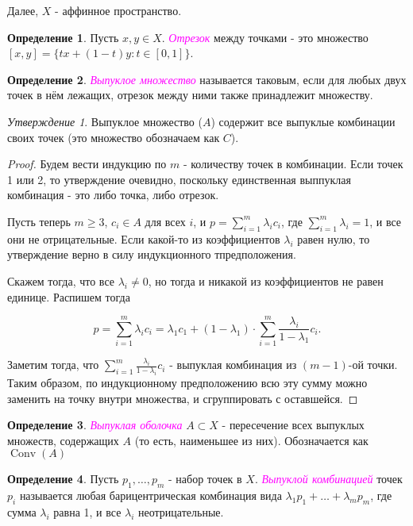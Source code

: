 \documentclass[a4paper,100pt]{article}
\theoremstyle{indented}
\theoremstyle{definition}
\newtheorem{defn}{Определение}
\theoremstyle{remark}
\newtheorem{stat}{Утверждение}
\DeclareMathOperator{\Conv}{Conv}
\begin{document}
Далее, $X$ - аффинное пространство.

\begin{defn}
    Пусть $x, y \in X$. \textit{\textcolor{magenta}{\hypertarget{s88}{Отрезок}}} между точками - это множество $[x, y] = \{tx+(1-t)y : t\in [0, 1]\}$. 
\end{defn}

\begin{defn}
    \textit{\textcolor{magenta}{\hypertarget{s89}{Выпуклое множество}}} называется таковым, если для любых двух точек в нём лежащих, отрезок между ними также принадлежит множеству.
\end{defn}

\begin{stat}
    Выпуклое множество ($A$) содержит все выпуклые комбинации своих точек (это множество обозначаем как $C$).
\end{stat}

\begin{proof}
    Будем вести индукцию по $m$ - количеству точек в комбинации. Если точек 1 или 2, то утверждение очевидно, поскольку единственная выппуклая комбинация - это либо точка, либо отрезок. \ 

    Пусть теперь $m \geq 3$, $c_i \in A$ для всех $i$, и $p = \sum_{i=1}^m \lambda_i c_i$, где $\sum_{i=1}^m \lambda_i = 1$, и все они не отрицательные. Если какой-то из коэффициентов $\lambda_i$ равен нулю, то утверждение верно в силу индукционного тпредположения. \ 

    Скажем тогда, что все $\lambda_i \neq 0$, но тогда и никакой из коэффициентов не равен единице. Распишем тогда

    \[
        p = \sum_{i=1}^m \lambda_i c_i = \lambda_1 c_1 + (1-\lambda_1) \cdot \sum_{i=1}^m \frac{\lambda_i}{1-\lambda_1} c_i. 
    \]

    Заметим тогда, что $\sum_{i=1}^m \frac{\lambda_i}{1-\lambda_i} c_i$ - выпуклая комбинация из $(m-1)$-ой точки. Таким образом, по индукционному предположению всю эту сумму можно заменить на точку внутри множества, и сгруппировать с оставшейся.
\end{proof}

\begin{defn}
    \textit{\textcolor{magenta}{\hypertarget{s90}{Выпуклая оболочка}}} $A\subset X$ - пересечение всех выпуклых множеств, содержащих $A$ (то есть, наименьшее из них). Обозначается как $\Conv(A)$
\end{defn}

\begin{defn}
    Пусть $p_1, \ldots, p_m$ - набор точек в $X$. \textit{\textcolor{magenta}{\hypertarget{s91}{Выпуклой комбинацией}}} точек $p_i$ называется любая барицентрическая комбинация вида $\lambda_1 p_1 + \ldots + \lambda_m p_m$, где сумма $\lambda_i$ равна 1, и все $\lambda_i$ неотрицательные.
\end{defn}
\end{document}
